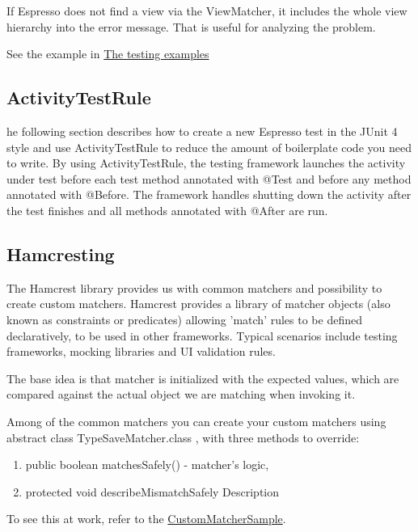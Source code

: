 If Espresso does not find a view via the ViewMatcher, it includes the whole view hierarchy into the error message. That is useful for analyzing the problem.

See the example in \href{https://github.com/googlesamples/android-testing}{The testing examples}


\subsection{ActivityTestRule}
he following section describes how to create a new Espresso test in the JUnit 4 style and use ActivityTestRule to reduce the amount of boilerplate code you need to write. By using ActivityTestRule, the testing framework launches the activity under test before each test method annotated with @Test and before any method annotated with @Before. The framework handles shutting down the activity after the test finishes and all methods annotated with @After are run.



\subsection{Hamcresting}
 The Hamcrest library provides us with common matchers and possibility to create custom matchers. Hamcrest provides a library of matcher objects (also known as constraints or predicates) allowing 'match' rules to be defined declaratively, to be used in other frameworks. Typical scenarios include testing frameworks, mocking libraries and UI validation rules.
 
 The base idea is that matcher is initialized with the expected values, which are compared against the actual object we are matching when invoking it.
 
 Among of the common matchers you can create your custom matchers using abstract class TypeSaveMatcher.class , with three methods to override:
 
 \begin{enumerate}
 	\item public boolean matchesSafely() - matcher's logic,
 	\item protected void describeMismatchSafely Description 
 \end{enumerate}

To see this at work, refer to the \href{https://github.com/googlesamples/android-testing/tree/master/ui/espresso/CustomMatcherSample}{CustomMatcherSample}.


